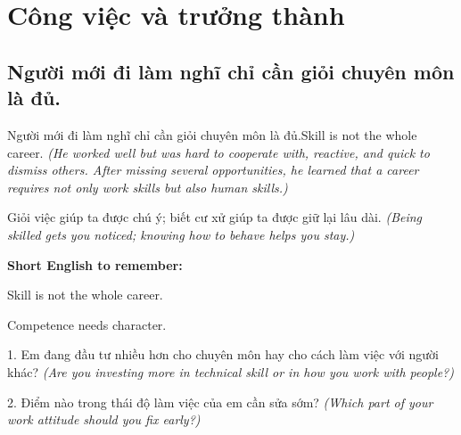 \chapter{Công việc và trưởng thành}

\section{Người mới đi làm nghĩ chỉ cần giỏi chuyên môn là đủ.}
\begin{truyen}{Người mới đi làm nghĩ chỉ cần giỏi chuyên môn là đủ.}{Skill is not the whole career.}
\textit{(He worked well but was hard to cooperate with, reactive, and quick to dismiss others. After missing several opportunities, he learned that a career requires not only work skills but also human skills.)}
\end{truyen}
\begin{baihoc}
Giỏi việc giúp ta được chú ý; biết cư xử giúp ta được giữ lại lâu dài.
\textit{(Being skilled gets you noticed; knowing how to behave helps you stay.)}
\end{baihoc}
\begin{ghinhoanh}
\textbf{Short English to remember:}

Skill is not the whole career.

Competence needs character.
\end{ghinhoanh}
\begin{tuhocnhanh}
1. Em đang đầu tư nhiều hơn cho chuyên môn hay cho cách làm việc với người khác? \textit{(Are you investing more in technical skill or in how you work with people?)}

2. Điểm nào trong thái độ làm việc của em cần sửa sớm? \textit{(Which part of your work attitude should you fix early?)}
\end{tuhocnhanh}
\ngancach

